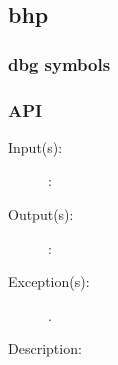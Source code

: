 %
%
%
%
%              

\label{bhp}
\subsection{bhp}

\subsubsection{dbg symbols}

\subsubsection{API}
\begin{description}
\label{bhp_}
\item[{\cfunc[]{bhp\_}{}}: ]
	\begin{description}\item[]
	\item[Input(s): ]
		\begin{description}\item[]
		\item[: ]
		\end{description}
	\item[Output(s): ]
		\begin{description}\item[]
		\item[: ]
		\end{description}
	\item[Exception(s): ]
		\begin{description}\item[]
		\item[.]
		\end{description}
	\item[Description: ]
	\end{description}
\end{description}
